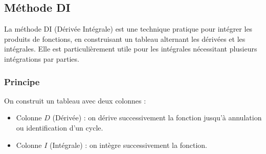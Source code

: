 












\subsection{Méthode DI}

La méthode DI (Dérivée Intégrale) est une technique pratique pour intégrer les produits de fonctions, en construisant un tableau alternant les dérivées et les intégrales. Elle est particulièrement utile pour les intégrales nécessitant plusieurs intégrations par parties.

\subsubsection*{Principe}

On construit un tableau avec deux colonnes :

\begin{itemize}
    \item Colonne $D$ (Dérivée) : on dérive successivement la fonction jusqu'à annulation ou identification d'un cycle.
    \item Colonne $I$ (Intégrale) : on intègre successivement la fonction.
\end{itemize}

